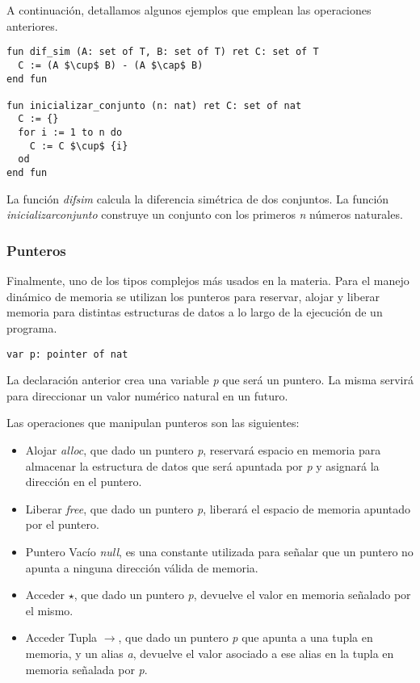 \documentclass{article}
\begin{document}
A continuación, detallamos algunos ejemplos que emplean las operaciones anteriores.

\begin{lstlisting}
fun dif_sim (A: set of T, B: set of T) ret C: set of T
  C := (A $\cup$ B) - (A $\cap$ B)
end fun

fun inicializar_conjunto (n: nat) ret C: set of nat
  C := {}
  for i := 1 to n do
    C := C $\cup$ {i}
  od
end fun
\end{lstlisting}

La función \textit{dif\gbajo sim} calcula la diferencia simétrica de dos conjuntos.
La función \textit{inicializar\gbajo conjunto} construye un conjunto con los primeros \textit{n} números naturales.

\subsubsection{Punteros}

Finalmente, uno de los tipos complejos más usados en la materia.
Para el manejo dinámico de memoria se utilizan los punteros para reservar, alojar y liberar memoria para distintas estructuras de datos a lo largo de la ejecución de un programa.

\begin{lstlisting}
var p: pointer of nat
\end{lstlisting}

La declaración anterior crea una variable \textit{p} que será un puntero.
La misma servirá para direccionar un valor numérico natural en un futuro.

Las operaciones que manipulan punteros son las siguientes:

\begin{itemize}
\item Alojar \textit{alloc}, que dado un puntero \textit{p}, reservará espacio en memoria para almacenar la estructura de datos que será apuntada por \textit{p} y asignará la dirección en el puntero.
\item Liberar \textit{free}, que dado un puntero \textit{p}, liberará el espacio de memoria apuntado por el puntero.
\item Puntero Vacío \textit{null}, es una constante utilizada para señalar que un puntero no apunta a ninguna dirección válida de memoria.
\item Acceder $\star$, que dado un puntero \textit{p}, devuelve el valor en memoria señalado por el mismo.
\item Acceder Tupla $\rightarrow$, que dado un puntero \textit{p} que apunta a una tupla en memoria, y un alias \textit{a}, devuelve el valor asociado a ese alias en la tupla en memoria señalada por \textit{p}.
\end{itemize}
\end{document}
